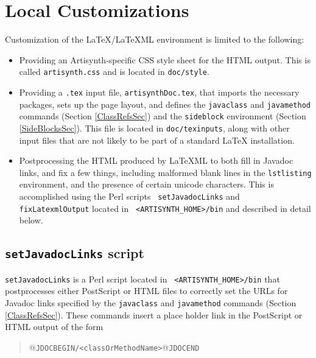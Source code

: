 \documentclass{article}
\begin{document}
\section{Local Customizations}
\label{LocalCustomizationSec}

Customization of the LaTeX/LaTeXML environment is limited to the
following:

\begin{itemize}

\item Providing an Artisynth-specific CSS style sheet for the HTML output.
This is called {\tt artisynth.css} and is located in {\tt doc/style}.

\item Providing a {\tt .tex} input file, {\tt artisynthDoc.tex}, that
imports the necessary packages, sets up the page layout, and defines
the {\tt \BKS javaclass} and {\tt \BKS javamethod} commands (Section
\ref{ClassRefsSec}) and the {\tt sideblock} environment (Section
\ref{SideBlocksSec}).  This file is located in {\tt doc/texinputs},
along with other input files that are not likely to be part of a
standard LaTeX installation.

\item Postprocessing the HTML produced by LaTeXML to both fill in
Javadoc links, and fix a few things, including malformed blank lines
in the {\tt lstlisting} environment, and the presence of certain
unicode characters.  This is accomplished using the Perl scripts {\tt
setJavadocLinks} and {\tt fixLatexmlOutput} located in {\tt
<ARTISYNTH\_HOME>/bin} and described in detail below.

\end{itemize}

\subsection{{\tt setJavadocLinks} script}
\label{setJavadocLinksSec}

{\tt setJavadocLinks} is a Perl script located in {\tt
<ARTISYNTH\_HOME>/bin} that postprocesses either PostScript or HTML
files to correctly set the URLs for Javadoc links specified by the
{\tt \BKS javaclass} and {\tt \BKS javamethod} commands (Section
\ref{ClassRefsSec}). These commands insert a place holder link in the
PostScript or HTML output of the form

\begin{quote}
@{\tt JDOCBEGIN/<classOrMethodName>}@{\tt JDOCEND}
\end{quote}
\end{document}

